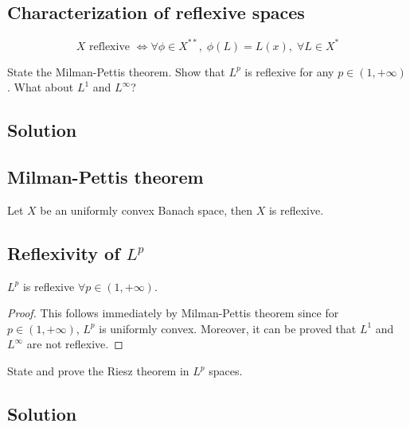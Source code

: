 \subsection{Characterization of reflexive spaces}
\[X \text{ reflexive } \iff \forall \phi \in X^{**},\;\phi(L)=L(x),\;\forall L\in X^*
\] 


\question
State the Milman-Pettis theorem. Show that $L^p$ is reflexive for any $p \in (1,+\infty)$. What about $L^1 $ and $L^\infty$?

\subsection*{Solution}

\subsection{Milman-Pettis theorem}
Let $X$ be an uniformly convex Banach space, then $X$ is reflexive.
\subsection{Reflexivity of \texorpdfstring{$L^p$}{Lp}}
$L^p$ is reflexive $\forall p \in (1,+\infty)$.

\begin{proof}
This follows immediately by Milman-Pettis theorem since for $ p \in (1,+\infty)$, $L^p$ is uniformly convex.\newline
Moreover, it can be proved that $L^1 $ and $L^\infty$ are not reflexive.
\end{proof}


\question
State and prove the Riesz theorem in $L^p$ spaces.

\subsection*{Solution}


